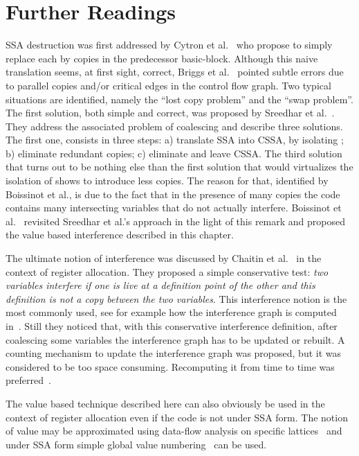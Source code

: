  \section{Further Readings}
SSA destruction was first addressed by Cytron et al.~\cite{CFR+91} who propose to simply replace each \phifun by copies in the predecessor basic-block. Although this naive translation seems, at first sight, correct, Briggs et
al.~\cite{BriggsSSA} pointed subtle errors due to parallel copies and/or
critical edges in the control flow graph. Two typical situations are
identified, namely the ``lost copy problem'' and the ``swap problem''.
The first solution, both simple and correct, was proposed by Sreedhar et al.~\cite{VC+99}. They address the associated problem of coalescing and describe three solutions. 
The first one, consists in three
steps: a) translate SSA into CSSA, by isolating \phifuns; b)
eliminate redundant copies; c) eliminate \phifuns and leave CSSA.
The third solution that turns out to be nothing else than the first solution that would virtualizes the isolation of \phifuns shows to introduce less copies. The reason for that, identified by Boissinot et al., is due to the fact that in the presence of many copies the code contains many intersecting variables that do not actually interfere. Boissinot et al.~\cite{Boissinot09} revisited Sreedhar et al.'s approach in the light of this remark and proposed the value based interference described in this chapter.

The ultimate notion of interference was discussed by Chaitin et al.~\cite{Chaitin81} in the context of register allocation. 
They proposed a simple conservative test: \emph{two variables interfere if
  one is live at a definition point of the other and this definition is not a
  copy between the two variables}. This interference notion is the most
commonly used, see for example how the interference graph is computed
in~\cite{appel:2002:modern}. Still they noticed that, with this conservative interference definition,
after coalescing some variables the interference graph has to be updated or rebuilt. 
A counting mechanism to update the interference graph was proposed,  but it was considered to be
too space consuming. Recomputing it from time to time was preferred~\cite{Chaitin81,Chaitin82}.

The value based technique described here can also obviously be used in the context of register allocation even if the code is not under SSA form. The notion of value may be approximated using data-flow analysis on specific lattices~\cite{AlpernWZ88} and under SSA form simple global value numbering~\cite{Rosen88} can be used.

